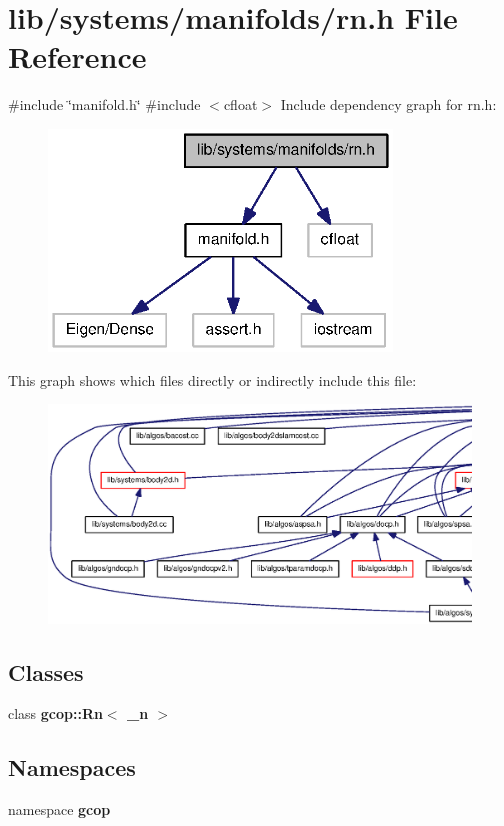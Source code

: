 \section{lib/systems/manifolds/rn.h \-File \-Reference}
\label{rn_8h}
{\ttfamily \#include \char`\"{}manifold.\-h\char`\"{}}\*
{\ttfamily \#include $<$cfloat$>$}\*
\-Include dependency graph for rn.\-h\-:
\nopagebreak
\begin{figure}[H]
\begin{center}
\leavevmode
\includegraphics[width=259pt]{rn_8h__incl}
\end{center}
\end{figure}
\-This graph shows which files directly or indirectly include this file\-:
\nopagebreak
\begin{figure}[H]
\begin{center}
\leavevmode
\includegraphics[width=350pt]{rn_8h__dep__incl}
\end{center}
\end{figure}
\subsection*{\-Classes}
\begin{DoxyCompactItemize}
\item 
class {\bf gcop\-::\-Rn$<$ \-\_\-n $>$}
\end{DoxyCompactItemize}
\subsection*{\-Namespaces}
\begin{DoxyCompactItemize}
\item 
namespace {\bf gcop}
\end{DoxyCompactItemize}

